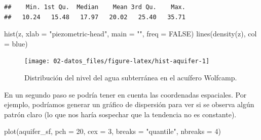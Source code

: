 \documentclass[
  spanish,
]{book}
\newenvironment{Shaded}{\begin{snugshade}}{\end{snugshade}}
\newcommand{\AttributeTok}[1]{\textcolor[rgb]{0.77,0.63,0.00}{#1}}
\newcommand{\ConstantTok}[1]{\textcolor[rgb]{0.00,0.00,0.00}{#1}}
\newcommand{\DecValTok}[1]{\textcolor[rgb]{0.00,0.00,0.81}{#1}}
\newcommand{\FunctionTok}[1]{\textcolor[rgb]{0.00,0.00,0.00}{#1}}
\newcommand{\NormalTok}[1]{#1}
\newcommand{\OtherTok}[1]{\textcolor[rgb]{0.56,0.35,0.01}{#1}}
\newcommand{\SpecialCharTok}[1]{\textcolor[rgb]{0.00,0.00,0.00}{#1}}
\newcommand{\StringTok}[1]{\textcolor[rgb]{0.31,0.60,0.02}{#1}}
\theoremstyle{break}
\theoremstyle{definition}
\theoremstyle{definition}
\theoremstyle{definition}
\theoremstyle{definition}
\theoremstyle{remark}
\begin{document}
\begin{Shaded}
\end{Shaded}

\begin{verbatim}
##    Min. 1st Qu.  Median    Mean 3rd Qu.    Max. 
##   10.24   15.48   17.97   20.02   25.40   35.71
\end{verbatim}

\begin{Shaded}
\begin{Highlighting}[]
\FunctionTok{hist}\NormalTok{(z, }\AttributeTok{xlab =} \StringTok{"piezometric{-}head"}\NormalTok{, }\AttributeTok{main =} \StringTok{""}\NormalTok{, }\AttributeTok{freq =} \ConstantTok{FALSE}\NormalTok{)}
\FunctionTok{lines}\NormalTok{(}\FunctionTok{density}\NormalTok{(z), }\AttributeTok{col =} \StringTok{\textquotesingle{}blue\textquotesingle{}}\NormalTok{)}
\end{Highlighting}
\end{Shaded}

\begin{figure}[!htb]

{\centering \texttt{[image: 02-datos\_files/figure-latex/hist-aquifer-1]} 

}

\caption{Distribución del nivel del agua subterránea en el acuífero Wolfcamp.}\label{fig:hist-aquifer}
\end{figure}

En un segundo paso se podría tener en cuenta las coordenadas espaciales.
Por ejemplo, podríamos generar un gráfico de dispersión para ver si se observa
algún patrón claro (lo que nos haría sospechar que la tendencia no es constante).

\begin{Shaded}
\begin{Highlighting}[]
\FunctionTok{plot}\NormalTok{(aquifer\_sf, }\AttributeTok{pch =} \DecValTok{20}\NormalTok{, }\AttributeTok{cex =} \DecValTok{3}\NormalTok{, }\AttributeTok{breaks =} \StringTok{"quantile"}\NormalTok{, }\AttributeTok{nbreaks =} \DecValTok{4}\NormalTok{)}
\end{Highlighting}
\end{Shaded}
\end{document}
